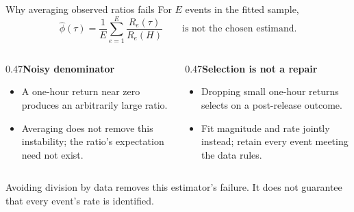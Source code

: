 \documentclass[aspectratio=169,11pt]{beamer}
\newcommand{\source}[1]{\par\vfill{\scriptsize\color{muted}#1}\par}
\newcommand{\heading}[1]{{\bfseries #1}\par\vspace{0.4em}}
\begin{document}
\begin{frame}{Why averaging observed ratios fails}
For $E$ events in the fitted sample,
\[\widehat\phi(\tau)=\frac1E\sum_{e=1}^E\frac{R_e(\tau)}{R_e(H)}
\qquad\text{is not the chosen estimand.}\]
\begin{columns}[T,onlytextwidth]
\begin{column}{0.47\textwidth}\heading{Noisy denominator}
\begin{itemize}
\item A one-hour return near zero produces an arbitrarily large ratio.
\item Averaging does not remove this instability; the ratio's expectation need not exist.
\end{itemize}\end{column}
\begin{column}{0.47\textwidth}\heading{Selection is not a repair}
\begin{itemize}
\item Dropping small one-hour returns selects on a post-release outcome.
\item Fit magnitude and rate jointly instead; retain every event meeting the data rules.
\end{itemize}\end{column}\end{columns}
\source{Avoiding division by data removes this estimator's failure. It does not guarantee that every event's rate is identified.}
\end{frame}
\end{document}
